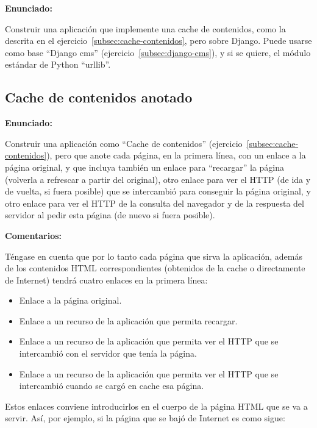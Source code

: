 \textbf{Enunciado:}

Construir una aplicación que implemente una cache de contenidos, como la descrita en el ejercicio~\ref{subsec:cache-contenidos}, pero sobre Django.
Puede usarse como base ``Django cms'' (ejercicio~\ref{subsec:django-cms}), y si se quiere, el módulo estándar de Python ``urllib''.

\subsection{Cache de contenidos anotado}
\label{subsec:cache-contenidos-anotado}

\textbf{Enunciado:}

Construir una aplicación como ``Cache de contenidos'' (ejercicio~\ref{subsec:cache-contenidos}), pero que anote cada página, en la primera línea, con un enlace a la página original, y que incluya también un enlace para ``recargar'' la página (volverla a refrescar a partir del original), otro enlace para ver el HTTP (de ida y de vuelta, si fuera posible) que se intercambió para conseguir la página original, y otro enlace para ver el HTTP de la consulta del navegador y de la respuesta del servidor al pedir esta página (de nuevo si fuera posible).

\textbf{Comentarios:}

Téngase en cuenta que por lo tanto cada página que sirva la aplicación, además de los contenidos  HTML correspondientes (obtenidos de la cache o directamente de Internet) tendrá cuatro enlaces en la primera línea:

\begin{itemize}
\item Enlace a la página original.
\item Enlace a un recurso de la aplicación que permita recargar.
\item Enlace a un recurso de la aplicación que permita ver el HTTP que se intercambió con el servidor que tenía la página.
\item Enlace a un recurso de la aplicación que permita ver el HTTP que se intercambió cuando se cargó en cache esa página.
\end{itemize}

Estos enlaces conviene introducirlos en el cuerpo de la página HTML que se va a servir. Así, por ejemplo, si la página que se bajó de Internet es como sigue:

